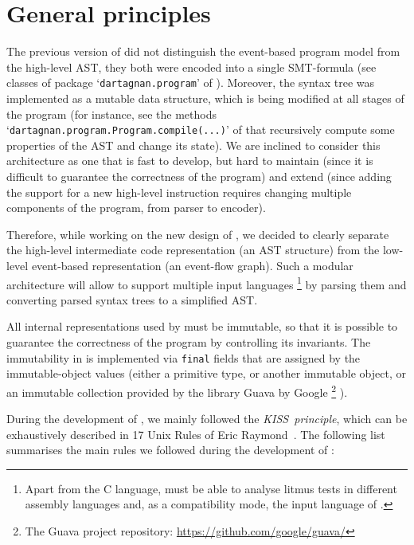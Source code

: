 \section{General principles}
\label{ch:impl:principles}

The previous version of \porthos{} did not distinguish the event-based program model from the high-level AST, they both were encoded into a single SMT-formula (see classes of package `\texttt{dartagnan.program}' of \porthos[1]).
Moreover, the syntax tree was implemented as a mutable data structure, which is being modified at all stages of the program (for instance, see the methods `\texttt{dartagnan.program.Program.compile(...)}' of \porthos{} that recursively compute some properties of the AST and change its state).
We are inclined to consider this architecture as one that is fast to develop, but hard to maintain (since it is difficult to guarantee the correctness of the program) and extend (since adding the support for a new high-level instruction requires changing multiple components of the program, from parser to encoder).

Therefore, while working on the new design of \porthos[2], we decided to clearly separate the high-level intermediate code representation (an AST structure) from the low-level event-based representation (an event-flow graph).
Such a modular architecture will allow to support multiple input languages%
%
\footnote{Apart from the C language, \porthos[2] must be able to analyse litmus tests in different assembly languages and, as a compatibility mode, the input language of \porthos[1].} %
%
by parsing them and converting parsed syntax trees to a simplified AST.

All internal representations used by \porthos[2] must be immutable, so that it is possible to guarantee the correctness of the program by controlling its invariants.
The immutability in \porthos[2] is implemented via \texttt{final} fields that are assigned by the immutable-object values (either a primitive type, or another immutable object, or an immutable collection provided by the library Guava by Google%
%
\footnote{The Guava project repository: \url{https://github.com/google/guava/}}%
%
).

During the development of \porthos[2], we mainly followed the \textit{KISS~principle}, which can be exhaustively described in 17 Unix Rules of Eric Raymond~\cite{raymond2003art}.
The following list summarises the main rules we followed during the development of \porthos[2]:

